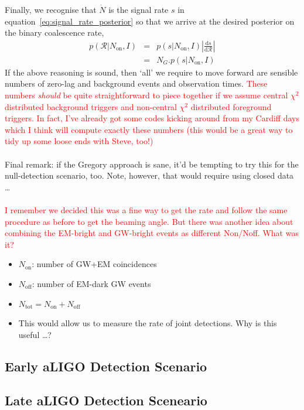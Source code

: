 \documentclass[nofootinbib]{revtex4}
\newcommand{\cbcrate}{{{\mathcal R}}}
\newcommand{\diff}{{\mathrm d}}
\begin{document}
Finally, we recognise that $\dot{N}$ is the signal rate $s$ in
equation~\ref{eq:signal_rate_posterior} so that we arrive at the desired
posterior on the binary coalescence rate, 
%
\begin{eqnarray}
p(\cbcrate|N_{\textrm{on}},I) & = & p(s|N_{\textrm{on}},I) \left|\frac{\diff
s}{\diff \cbcrate}\right| \\
& = & N_G . p(s|N_{\textrm{on}},I)
\end{eqnarray}
%
If the above reasoning is sound, then `all' we require to move forward are
sensible numbers of zero-lag and background events and observation times.
\textcolor{red}{These numbers \emph{should} be quite straightforward to piece
together if we assume central $\chi^2$ distributed background triggers and
non-central $\chi^2$ distributed foreground triggers.  In fact, I've already got
some codes kicking around from my Cardiff days which I think will compute
exactly these numbers (this would be a great way to tidy up some loose ends with
Steve, too!)}
\\ \\
Final remark: if the Gregory approach is sane, it'd be tempting to try this for
the null-detection scenario, too.  Note, however, that would require using
closed data \dots
\\ \\
\textcolor{red}{I remember we decided this was a fine way to get the rate and
follow the same procedure as before to get the beaming angle.  But there was
another idea about combining the EM-bright and GW-bright events as different
Non/Noff.  What was it?}

\begin{itemize}
\item $N_{\mathrm{on}}$: number of GW+EM coincidences
\item $N_{\mathrm{off}}$: number of EM-dark GW events
\item $N_{\mathrm{tot}} = N_{\mathrm{on}} + N_{\mathrm{off}}$
\item This would allow us to measure the rate of joint detections.  Why is this
useful \dots ?   
\end{itemize}

\subsection{Early aLIGO Detection Scenario}
\subsection{Late aLIGO Detection Sceneario}
\end{document}
